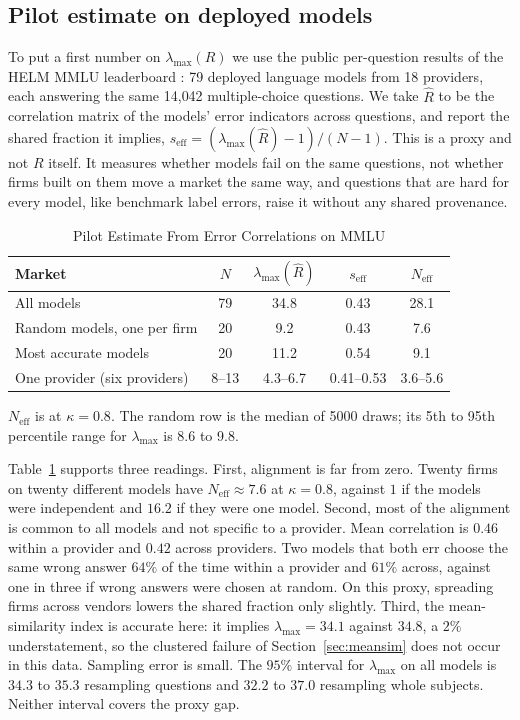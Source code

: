\documentclass[conference]{IEEEtran}
\theoremstyle{definition}
\newcommand{\Neff}{N_{\mathrm{eff}}}
\newcommand{\lmax}{\lambda_{\max}}
\newcommand{\seff}{s_{\mathrm{eff}}}
\begin{document}
\subsection{Pilot estimate on deployed models}\label{sec:pilot}
To put a first number on $\lmax(R)$ we use the public per-question results of
the HELM MMLU leaderboard \cite{liang2023,hendrycks2021}: 79 deployed language
models from 18 providers, each answering the same 14{,}042 multiple-choice
questions. We take $\hat{R}$ to be the correlation matrix of the models' error
indicators across questions, and report the shared fraction it implies,
$\seff = (\lmax(\hat{R})-1)/(N-1)$. This is a proxy and not $R$ itself. It
measures whether models fail on the same questions, not whether firms built on
them move a market the same way, and questions that are hard for every model,
like benchmark label errors, raise it without any shared provenance.

\begin{table}[t]
  \caption{Pilot Estimate From Error Correlations on MMLU}
  \label{tab:pilot}
  \centering
  \footnotesize
  \setlength{\tabcolsep}{4pt}
  \begin{tabular}{@{}lcccc@{}}
    \toprule
    Market & $N$ & $\lmax(\hat{R})$ & $\seff$ & $\Neff$ \\
    \midrule
    All models                  & 79    & 34.8     & 0.43       & 28.1 \\
    Random models, one per firm & 20    & 9.2      & 0.43       & 7.6  \\
    Most accurate models        & 20    & 11.2     & 0.54       & 9.1  \\
    One provider (six providers) & 8--13 & 4.3--6.7 & 0.41--0.53 & 3.6--5.6 \\
    \bottomrule
  \end{tabular}

  \smallskip
  \parbox{\columnwidth}{\footnotesize $\Neff$ is at $\kappa = 0.8$. The random
  row is the median of 5000 draws; its 5th to 95th percentile range for
  $\lmax$ is 8.6 to 9.8.}
\end{table}

Table~\ref{tab:pilot} supports three readings. First, alignment is far from
zero. Twenty firms on twenty different models have $\Neff \approx 7.6$ at
$\kappa = 0.8$, against $1$ if the models were independent and $16.2$ if they
were one model. Second, most of the alignment is common to all models and not
specific to a provider. Mean correlation is $0.46$ within a provider and
$0.42$ across providers. Two models that both err choose the same wrong answer
$64\%$ of the time within a provider and $61\%$ across, against one in three
if wrong answers were chosen at random. On this proxy, spreading firms across
vendors lowers the shared fraction only slightly. Third, the mean-similarity
index is accurate here: it implies $\lmax = 34.1$ against $34.8$, a $2\%$
understatement, so the clustered failure of Section~\ref{sec:meansim} does not
occur in this data. Sampling error is small. The $95\%$ interval for $\lmax$
on all models is $34.3$ to $35.3$ resampling questions and $32.2$ to $37.0$
resampling whole subjects. Neither interval covers the proxy gap.
\end{document}
